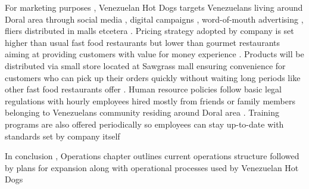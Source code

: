 For marketing purposes , Venezuelan Hot Dogs targets Venezuelans living around Doral area through social media , digital campaigns , word-of-mouth advertising , fliers distributed in malls etcetera . Pricing strategy adopted by company is set higher than usual fast food restaurants but lower than gourmet restaurants aiming at providing customers with value for money experience . Products will be distributed via small store located at Sawgrass mall ensuring convenience for customers who can pick up their orders quickly without waiting long periods like other fast food restaurants offer . Human resource policies follow basic legal regulations with hourly employees hired mostly from friends or family members belonging to Venezuelans community residing around Doral area . Training programs are also offered periodically so employees can stay up-to-date with standards set by company itself  

In conclusion , Operations chapter outlines current operations structure followed by plans for expansion along with operational processes used by Venezuelan Hot Dogs